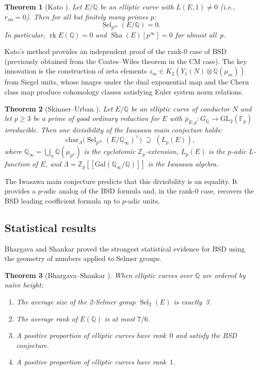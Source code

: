 \documentclass[11pt]{article}
\newtheorem{theorem}{Theorem}[section]
\DeclareMathOperator{\rk}{rk}
\DeclareMathOperator{\Sha}{Sha}
\DeclareMathOperator{\Sel}{Sel}
\begin{document}
\begin{theorem}[Kato \cite{Kato}]
\label{thm:kato}
Let $E/\mathbb{Q}$ be an elliptic curve with $L(E,1) \neq 0$ (i.e.,
$r_{\mathrm{an}} = 0$).  Then for all but finitely many primes $p$:
\[
  \Sel_{p^\infty}(E/\mathbb{Q}) = 0.
\]
In particular, $\rk E(\mathbb{Q}) = 0$ and $\Sha(E)[p^\infty] = 0$ for
almost all~$p$.
\end{theorem}

\noindent
Kato's method provides an independent proof of the rank-0 case of BSD
(previously obtained from the Coates--Wiles theorem in the CM case).  The
key innovation is the construction of zeta elements
$z_m \in K_2(Y_1(N) \otimes \mathbb{Q}(\mu_m))$ from Siegel units, whose
images under the dual exponential map and the Chern class map produce
cohomology classes satisfying Euler system norm relations.

\begin{theorem}[Skinner--Urban \cite{SU}]
\label{thm:skinner-urban}
Let $E/\mathbb{Q}$ be an elliptic curve of conductor $N$ and let $p \geq 3$ be
a prime of good ordinary reduction for $E$ with
$\bar{\rho}_{E,p} : G_\mathbb{Q} \to \mathrm{GL}_2(\mathbb{F}_p)$
irreducible.  Then one divisibility of the Iwasawa main conjecture holds:
\[
  \mathrm{char}_{\Lambda}\!\bigl(
    \Sel_{p^\infty}(E/\mathbb{Q}_\infty)^\vee
  \bigr)
  \;\supseteq\;
  (L_p(E)),
\]
where $\mathbb{Q}_\infty = \bigcup_n \mathbb{Q}(\mu_{p^n})$ is the cyclotomic
$\mathbb{Z}_p$-extension, $L_p(E)$ is the $p$-adic $L$-function of $E$, and
$\Lambda = \mathbb{Z}_p[[\mathrm{Gal}(\mathbb{Q}_\infty/\mathbb{Q})]]$ is the
Iwasawa algebra.
\end{theorem}

\noindent
The Iwasawa main conjecture predicts that this divisibility is an equality.
It provides a $p$-adic analog of the BSD formula and, in the rank-0 case,
recovers the BSD leading coefficient formula up to $p$-adic units.

\subsection{Statistical results}

Bhargava and Shankar \cite{BS} proved the strongest statistical evidence for
BSD using the geometry of numbers applied to Selmer groups.

\begin{theorem}[Bhargava--Shankar \cite{BS}]
\label{thm:bhargava-shankar}
When elliptic curves over $\mathbb{Q}$ are ordered by na\"ive height:
\begin{enumerate}
  \item The average size of the 2-Selmer group $\Sel_2(E)$ is exactly~3.
  \item The average rank of $E(\mathbb{Q})$ is at most $7/6$.
  \item A positive proportion of elliptic curves have rank~$0$ and satisfy
    the BSD conjecture.
  \item A positive proportion of elliptic curves have rank~$1$.
\end{enumerate}
\end{theorem}
\end{document}
